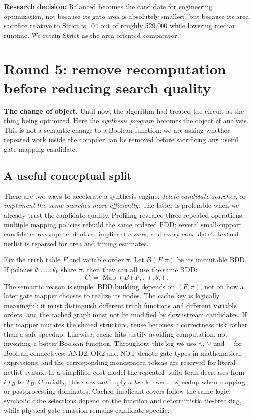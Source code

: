 \documentclass[a4paper,10pt]{article}
\theoremstyle{definition}
\theoremstyle{remark}
\begin{document}
\textbf{Research decision:} Balanced becomes the candidate for engineering optimization, not because its gate area is absolutely smallest, but because its area sacrifice relative to Strict is 104 out of roughly 529,000 while lowering median runtime. We retain Strict as the area-oriented comparator.

\section{Round 5: remove recomputation before reducing search quality}
\textbf{The change of object.} Until now, the algorithm had treated the circuit as the thing being optimized. Here the \emph{synthesis program} becomes the object of analysis. This is not a semantic change to a Boolean function: we are asking whether repeated work inside the compiler can be removed before sacrificing any useful gate mapping candidate.
\subsection{A useful conceptual split}
There are two ways to accelerate a synthesis engine: \emph{delete candidate searches}, or \emph{implement the same searches more efficiently}. The latter is preferable when we already trust the candidate quality. Profiling revealed three repeated operations: multiple mapping policies rebuild the same ordered BDD; several small-support candidates recompute identical implicant covers; and every candidate's textual netlist is reparsed for area and timing estimates.

Fix the truth table $F$ and variable order $\pi$. Let $B(F,\pi)$ be its immutable BDD. If policies $\theta_1,\ldots,\theta_k$ share $\pi$, then they can all use the same BDD:
\begin{equation}
 C_i=\operatorname{Map}(B(F,\pi),\theta_i).
\end{equation}
The semantic reason is simple: BDD building depends on $(F,\pi)$, not on how a later gate mapper chooses to realize its nodes. The cache key is logically meaningful: it must distinguish different truth functions and different variable orders, and the cached graph must not be modified by downstream candidates. If the mapper mutates the shared structure, reuse becomes a correctness risk rather than a safe speedup. Likewise, cache hits justify avoiding computation, not inventing a better Boolean function. Throughout this log we use $\land$, $\lor$ and $\neg$ for Boolean connectives; $\mathrm{AND2}$, $\mathrm{OR2}$ and $\mathrm{NOT}$ denote gate types in mathematical expressions; and the corresponding monospaced tokens are reserved for literal netlist syntax. In a simplified cost model the repeated build term decreases from $kT_B$ to $T_B$. Crucially, this does \emph{not} imply a $k$-fold overall speedup when mapping or postprocessing dominates. Cached implicant covers follow the same logic: symbolic cube selections depend on the function and deterministic tie-breaking, while physical gate emission remains candidate-specific.
\end{document}
